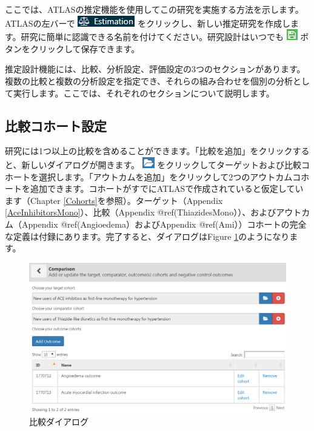 \documentclass[
  11pt]{book}
\theoremstyle{definition}
\theoremstyle{definition}
\theoremstyle{definition}
\theoremstyle{definition}
\theoremstyle{remark}
\begin{document}
ここでは、ATLASの推定機能を使用してこの研究を実施する方法を示します。ATLASの左バーで \includegraphics{images/PopulationLevelEstimation/estimation.png} をクリックし、新しい推定研究を作成します。研究に簡単に認識できる名前を付けてください。研究設計はいつでも \includegraphics{images/PopulationLevelEstimation/save.png} ボタンをクリックして保存できます。

推定設計機能には、比較、分析設定、評価設定の3つのセクションがあります。複数の比較と複数の分析設定を指定でき、それらの組み合わせを個別の分析として実行します。ここでは、それぞれのセクションについて説明します。

\subsection{比較コホート設定}\label{ComparisonSettings}

研究には1つ以上の比較を含めることができます。「比較を追加」をクリックすると、新しいダイアログが開きます。 \includegraphics{images/PopulationLevelEstimation/open.png} をクリックしてターゲットおよび比較コホートを選択します。「アウトカムを追加」をクリックして2つのアウトカムコホートを追加できます。コホートがすでにATLASで作成されていると仮定しています（Chapter \ref{Cohorts}を参照）。ターゲット（Appendix \ref{AceInhibitorsMono}）、比較（Appendix @ref(ThiazidesMono））、およびアウトカム（Appendix @ref(Angioedema）およびAppendix @ref(Ami））コホートの完全な定義は付録にあります。完了すると、ダイアログはFigure \ref{fig:comparisons}のようになります。

\begin{figure}

{\centering \includegraphics[width=1\linewidth]{images/PopulationLevelEstimation/comparisons} 

}

\caption{比較ダイアログ}\label{fig:comparisons}
\end{figure}
\end{document}
